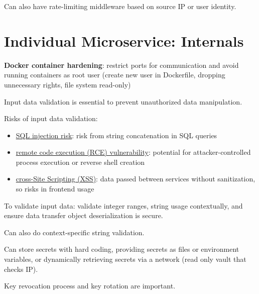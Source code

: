 \documentclass[11pt]{article}
\begin{document}
Can also have rate-limiting middleware based on source IP or user identity.
\section{Individual Microservice: Internals}
\label{sec:org7c9a637}
\textbf{Docker container hardening}: restrict ports for communication and avoid running
containers as root user (create new user in Dockerfile, dropping unnecessary
rights, file system read-only)

Input data validation is essential to prevent unauthorized data manipulation.

Risks of input data validation:
\begin{itemize}
\item \uline{SQL injection risk}: risk from string concatenation in SQL queries
\item \uline{remote code execution (RCE) vulnerability}: potential for attacker-controlled
process execution or reverse shell creation
\item \uline{cross-Site Scripting (XSS)}: data passed between services without sanitization,
so risks in frontend usage
\end{itemize}

To validate input data: validate integer ranges, string usage contextually, and
ensure data transfer object deserialization is secure.

Can also do context-specific string validation.

Can store secrets with hard coding, providing secrets as files or environment variables,
or dynamically retrieving secrets via a network (read only vault that checks IP).

Key revocation process and key rotation are important.
\end{document}

